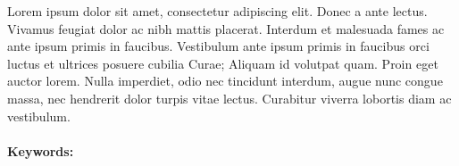 \begin{singlespace}

\noindent Lorem ipsum dolor sit amet, consectetur adipiscing elit. Donec a ante lectus. Vivamus feugiat dolor ac nibh mattis placerat. Interdum et malesuada fames ac ante ipsum primis in faucibus. Vestibulum ante ipsum primis in faucibus orci luctus et ultrices posuere cubilia Curae; Aliquam id volutpat quam. Proin eget auctor lorem. Nulla imperdiet, odio nec tincidunt interdum, augue nunc congue massa, nec hendrerit dolor turpis vitae lectus. Curabitur viverra lobortis diam ac vestibulum.\\\\
\textbf{Keywords:} \textsf{\enUSKeyword}
\end{singlespace}